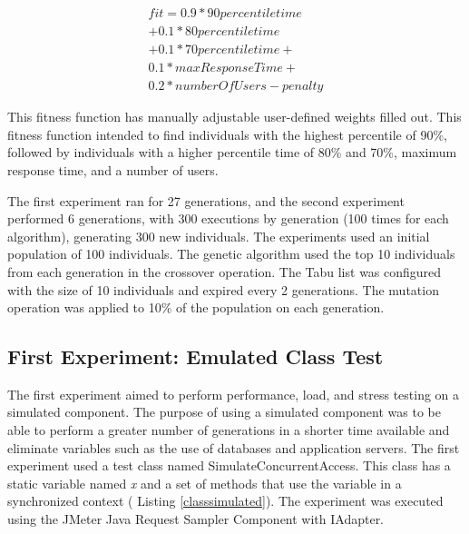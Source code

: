 \documentclass[espaco=umemeio,chapter=TITLE,twoside,openright]{abnt}
\begin{document}
\begin{equation}
\begin{aligned}
fit=0.9* 90percentiletime\\
+0.1*80percentiletime\\+
0.1*70percentiletime+\\
0.1*maxResponseTime+\\
0.2*numberOfUsers-penalty
\end{aligned}
\end{equation}

This fitness function has manually adjustable user-defined weights filled out. This fitness function intended to find individuals with the highest percentile of 90\%, followed by individuals with a higher percentile time of 80\% and 70\%, maximum response time, and a number of users.

The first experiment ran for 27 generations, and the second experiment  performed 6 generations, with 300 executions by generation (100 times for each algorithm),  generating 300 new individuals. The experiments used an initial population of 100 individuals. The genetic algorithm used the top 10 individuals from each generation in the crossover operation. The Tabu list was configured with the size of 10 individuals and expired every 2 generations.  The mutation operation was applied to 10\% of the population on each generation.

\subsection{First Experiment: Emulated Class Test}

The first experiment aimed to perform performance, load, and stress testing on a simulated component. The purpose of using a simulated component was to be able to perform a greater number of generations in a shorter time available and eliminate variables such as the use of databases and application servers. The first experiment used a test class  named SimulateConcurrentAccess. This class has a static variable named \textit{x} and a set of methods that use the variable in a synchronized context ( Listing \ref{classsimulated}). The experiment was executed using the JMeter Java Request Sampler Component with IAdapter.

\end{document}
